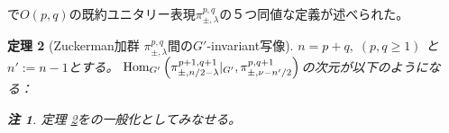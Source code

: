 \documentclass[12pt]{article} %
\newcommand{\Hom}{\mbox{\normalfont Hom}}
\newtheorem{theorem}{定理}
\newtheorem{remark}[theorem]{注}
\theoremstyle{definition}
\theoremstyle{exampstyle} \newtheorem{examp}[theorem]{Theorem}
\begin{document}
\cite{KO2}で$O(p,q)$の既約ユニタリー表現$\pi_{\pm,\lambda}^{p,q}$の５つ同値な定義が述べられた。
\begin{theorem}[Zuckerman加群 $\pi_{\pm,\lambda}^{p,q}$間の$G'$-invariant写像]\label{thm:Aq}
	$n=p+q,\;(p,q\ge1)$ と $n':=n-1$とする。
	$\Hom_{G'}\left(\pi_{\pm,{n}/{2}-\lambda}^{p+1,q+1}\kern-0.3em\mid_{G'} ,\pi_{\pm,\nu-{n'}/{2}}^{p,q+1} \right)$の次元が以下のようになる：
	\newline
{}\\\vspace{\baselineskip}
\begin{remark}
定理 \ref{thm:Aq}を\cite[Thms. 12.1 and 1.3]{kobayashi2015symmetry}の一般化としてみなせる。
\end{remark}
\end{theorem}
\nocite{kobayashi2015program}
\small


\end{document}
